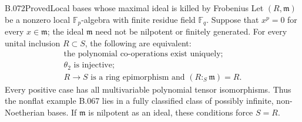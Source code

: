 \begin{saresult}{B.072}{Proved}{Local bases whose maximal ideal is killed by Frobenius}
Let $(R,\mathfrak m)$ be a nonzero local $\mathbb F_p$-algebra with
finite residue field $\mathbb F_q$. Suppose that $x^p=0$ for every
$x\in\mathfrak m$; the ideal $\mathfrak m$ need not be nilpotent or
finitely generated. For every unital inclusion $R\subset S$, the following
are equivalent:
\[
\begin{gathered}
 \text{the polynomial co-operations exist uniquely};\\
 \theta_2\text{ is injective};\\
 R\longrightarrow S\text{ is a ring epimorphism and }
                     (R:_S\mathfrak m)=R.                \tag{B72.1}
\end{gathered}
\]
Every positive case has all multivariable polynomial tensor isomorphisms.
Thus the nonflat example B.067 lies in a fully classified class of
possibly infinite, non-Noetherian bases. If $\mathfrak m$ is nilpotent as
an ideal, these conditions force $S=R$.
\end{saresult}
